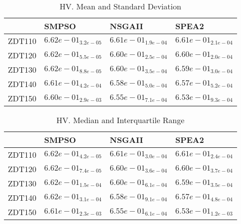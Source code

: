 \documentclass{article}
\begin{document}
\begin{table}
\caption{HV. Mean and Standard Deviation}
\label{table: HV}
\centering
\begin{scriptsize}
\begin{tabular}{llll}
\hline & SMPSO & NSGAII &  SPEA2\\
\hline 
ZDT110 & \cellcolor{gray95}$  6.62e-01_{ 3.2e-05}$ & $  6.61e-01_{ 1.9e-04}$ & \cellcolor{gray25}$  6.61e-01_{ 2.1e-04}$ \\
ZDT120 & \cellcolor{gray95}$  6.62e-01_{ 5.5e-05}$ & $  6.60e-01_{ 2.5e-04}$ & \cellcolor{gray25}$  6.60e-01_{ 2.0e-04}$ \\
ZDT130 & \cellcolor{gray95}$  6.62e-01_{ 8.8e-05}$ & \cellcolor{gray25}$  6.60e-01_{ 3.5e-04}$ & $  6.59e-01_{ 3.0e-04}$ \\
ZDT140 & \cellcolor{gray95}$  6.61e-01_{ 4.2e-04}$ & \cellcolor{gray25}$  6.58e-01_{ 5.0e-04}$ & $  6.57e-01_{ 5.2e-04}$ \\
ZDT150 & \cellcolor{gray95}$  6.60e-01_{ 2.9e-03}$ & \cellcolor{gray25}$  6.55e-01_{ 7.1e-04}$ & $  6.53e-01_{ 9.3e-04}$ \\
\hline
\end{tabular}
\end{scriptsize}
\end{table}

\begin{table}
\caption{HV. Median and Interquartile Range}
\label{table: HV}
\centering
\begin{scriptsize}
\begin{tabular}{llll}
\hline & SMPSO & NSGAII &  SPEA2\\
\hline 
ZDT110 & \cellcolor{gray95}$  6.62e-01_{ 4.2e-05}$ & $  6.61e-01_{ 3.0e-04}$ & \cellcolor{gray25}$  6.61e-01_{ 2.4e-04}$ \\
ZDT120 & \cellcolor{gray95}$  6.62e-01_{ 7.4e-05}$ & \cellcolor{gray25}$  6.60e-01_{ 3.6e-04}$ & $  6.60e-01_{ 3.7e-04}$ \\
ZDT130 & \cellcolor{gray95}$  6.62e-01_{ 1.5e-04}$ & \cellcolor{gray25}$  6.60e-01_{ 6.1e-04}$ & $  6.59e-01_{ 3.5e-04}$ \\
ZDT140 & \cellcolor{gray95}$  6.62e-01_{ 3.1e-04}$ & \cellcolor{gray25}$  6.58e-01_{ 9.1e-04}$ & $  6.57e-01_{ 4.8e-04}$ \\
ZDT150 & \cellcolor{gray95}$  6.61e-01_{ 2.3e-03}$ & \cellcolor{gray25}$  6.55e-01_{ 6.1e-04}$ & $  6.53e-01_{ 1.2e-03}$ \\
\hline
\end{tabular}
\end{scriptsize}
\end{table}
\end{document}
